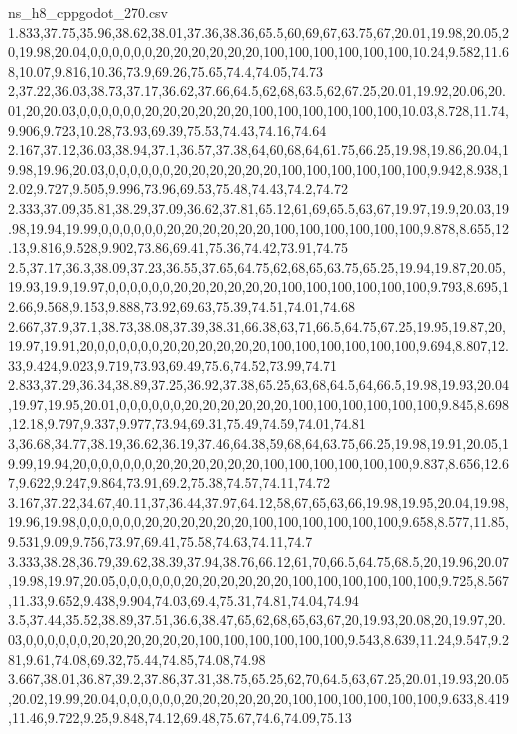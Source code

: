 \begin{filecontents*}[overwrite]{ns_h8_cppgodot_270.csv}
1.833,37.75,35.96,38.62,38.01,37.36,38.36,65.5,60,69,67,63.75,67,20.01,19.98,20.05,20,19.98,20.04,0,0,0,0,0,0,20,20,20,20,20,20,100,100,100,100,100,100,10.24,9.582,11.68,10.07,9.816,10.36,73.9,69.26,75.65,74.4,74.05,74.73
2,37.22,36.03,38.73,37.17,36.62,37.66,64.5,62,68,63.5,62,67.25,20.01,19.92,20.06,20.01,20,20.03,0,0,0,0,0,0,20,20,20,20,20,20,100,100,100,100,100,100,10.03,8.728,11.74,9.906,9.723,10.28,73.93,69.39,75.53,74.43,74.16,74.64
2.167,37.12,36.03,38.94,37.1,36.57,37.38,64,60,68,64,61.75,66.25,19.98,19.86,20.04,19.98,19.96,20.03,0,0,0,0,0,0,20,20,20,20,20,20,100,100,100,100,100,100,9.942,8.938,12.02,9.727,9.505,9.996,73.96,69.53,75.48,74.43,74.2,74.72
2.333,37.09,35.81,38.29,37.09,36.62,37.81,65.12,61,69,65.5,63,67,19.97,19.9,20.03,19.98,19.94,19.99,0,0,0,0,0,0,20,20,20,20,20,20,100,100,100,100,100,100,9.878,8.655,12.13,9.816,9.528,9.902,73.86,69.41,75.36,74.42,73.91,74.75
2.5,37.17,36.3,38.09,37.23,36.55,37.65,64.75,62,68,65,63.75,65.25,19.94,19.87,20.05,19.93,19.9,19.97,0,0,0,0,0,0,20,20,20,20,20,20,100,100,100,100,100,100,9.793,8.695,12.66,9.568,9.153,9.888,73.92,69.63,75.39,74.51,74.01,74.68
2.667,37.9,37.1,38.73,38.08,37.39,38.31,66.38,63,71,66.5,64.75,67.25,19.95,19.87,20,19.97,19.91,20,0,0,0,0,0,0,20,20,20,20,20,20,100,100,100,100,100,100,9.694,8.807,12.33,9.424,9.023,9.719,73.93,69.49,75.6,74.52,73.99,74.71
2.833,37.29,36.34,38.89,37.25,36.92,37.38,65.25,63,68,64.5,64,66.5,19.98,19.93,20.04,19.97,19.95,20.01,0,0,0,0,0,0,20,20,20,20,20,20,100,100,100,100,100,100,9.845,8.698,12.18,9.797,9.337,9.977,73.94,69.31,75.49,74.59,74.01,74.81
3,36.68,34.77,38.19,36.62,36.19,37.46,64.38,59,68,64,63.75,66.25,19.98,19.91,20.05,19.99,19.94,20,0,0,0,0,0,0,20,20,20,20,20,20,100,100,100,100,100,100,9.837,8.656,12.67,9.622,9.247,9.864,73.91,69.2,75.38,74.57,74.11,74.72
3.167,37.22,34.67,40.11,37,36.44,37.97,64.12,58,67,65,63,66,19.98,19.95,20.04,19.98,19.96,19.98,0,0,0,0,0,0,20,20,20,20,20,20,100,100,100,100,100,100,9.658,8.577,11.85,9.531,9.09,9.756,73.97,69.41,75.58,74.63,74.11,74.7
3.333,38.28,36.79,39.62,38.39,37.94,38.76,66.12,61,70,66.5,64.75,68.5,20,19.96,20.07,19.98,19.97,20.05,0,0,0,0,0,0,20,20,20,20,20,20,100,100,100,100,100,100,9.725,8.567,11.33,9.652,9.438,9.904,74.03,69.4,75.31,74.81,74.04,74.94
3.5,37.44,35.52,38.89,37.51,36.6,38.47,65,62,68,65,63,67,20,19.93,20.08,20,19.97,20.03,0,0,0,0,0,0,20,20,20,20,20,20,100,100,100,100,100,100,9.543,8.639,11.24,9.547,9.281,9.61,74.08,69.32,75.44,74.85,74.08,74.98
3.667,38.01,36.87,39.2,37.86,37.31,38.75,65.25,62,70,64.5,63,67.25,20.01,19.93,20.05,20.02,19.99,20.04,0,0,0,0,0,0,20,20,20,20,20,20,100,100,100,100,100,100,9.633,8.419,11.46,9.722,9.25,9.848,74.12,69.48,75.67,74.6,74.09,75.13

\end{filecontents*}
